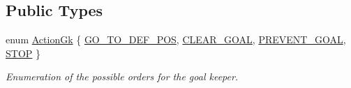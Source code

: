 \subsection*{Public Types}
\begin{DoxyCompactItemize}
\item 
enum \hyperlink{classGoalkeeper_a25db0bed632b4bdb87532b0fbbf45855}{ActionGk} \{ \hyperlink{classGoalkeeper_a25db0bed632b4bdb87532b0fbbf45855af1fa8ff07676a5e27f9cc78f6811c704}{GO\_\-TO\_\-DEF\_\-POS}, 
\hyperlink{classGoalkeeper_a25db0bed632b4bdb87532b0fbbf45855a16f1efd31d6ead68306d343d85059ca2}{CLEAR\_\-GOAL}, 
\hyperlink{classGoalkeeper_a25db0bed632b4bdb87532b0fbbf45855a96b7bc8aa3f3a4d1b68955f8d757e9c1}{PREVENT\_\-GOAL}, 
\hyperlink{classGoalkeeper_a25db0bed632b4bdb87532b0fbbf45855a7940a4d0074c5f5bb33743797387c2c1}{STOP}
 \}
\begin{DoxyCompactList}\small\item\em Enumeration of the possible orders for the goal keeper. \item\end{DoxyCompactList}\end{DoxyCompactItemize}
